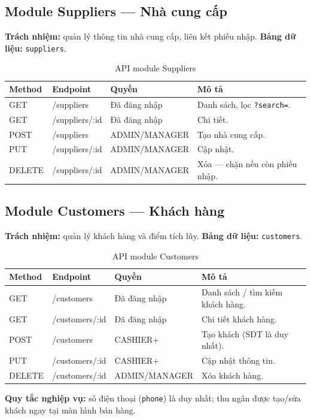 \documentclass[12pt,a4paper]{report}
\begin{document}
\subsection{Module Suppliers --- Nhà cung cấp}
\textbf{Trách nhiệm:} quản lý thông tin nhà cung cấp, liên kết phiếu nhập. \textbf{Bảng dữ liệu:} \texttt{suppliers}.
\begin{table}[H]\centering\small
\begin{tabularx}{\textwidth}{|L{1.5cm}|L{3.6cm}|L{3.4cm}|X|}
\hline
\textbf{Method} & \textbf{Endpoint} & \textbf{Quyền} & \textbf{Mô tả} \\ \hline
GET & /suppliers & Đã đăng nhập & Danh sách, lọc \texttt{?search=}. \\ \hline
GET & /suppliers/:id & Đã đăng nhập & Chi tiết. \\ \hline
POST & /suppliers & ADMIN/MANAGER & Tạo nhà cung cấp. \\ \hline
PUT & /suppliers/:id & ADMIN/MANAGER & Cập nhật. \\ \hline
DELETE & /suppliers/:id & ADMIN/MANAGER & Xóa --- chặn nếu còn phiếu nhập. \\ \hline
\end{tabularx}
\caption{API module Suppliers}
\end{table}

\subsection{Module Customers --- Khách hàng}
\textbf{Trách nhiệm:} quản lý khách hàng và điểm tích lũy. \textbf{Bảng dữ liệu:} \texttt{customers}.
\begin{table}[H]\centering\small
\begin{tabularx}{\textwidth}{|L{1.5cm}|L{3.6cm}|L{3.4cm}|X|}
\hline
\textbf{Method} & \textbf{Endpoint} & \textbf{Quyền} & \textbf{Mô tả} \\ \hline
GET & /customers & Đã đăng nhập & Danh sách / tìm kiếm khách hàng. \\ \hline
GET & /customers/:id & Đã đăng nhập & Chi tiết khách hàng. \\ \hline
POST & /customers & CASHIER+ & Tạo khách (SĐT là duy nhất). \\ \hline
PUT & /customers/:id & CASHIER+ & Cập nhật thông tin. \\ \hline
DELETE & /customers/:id & ADMIN/MANAGER & Xóa khách hàng. \\ \hline
\end{tabularx}
\caption{API module Customers}
\end{table}
\textbf{Quy tắc nghiệp vụ:} số điện thoại (\texttt{phone}) là duy nhất; thu ngân được tạo/sửa khách ngay tại màn hình bán hàng.
\end{document}

